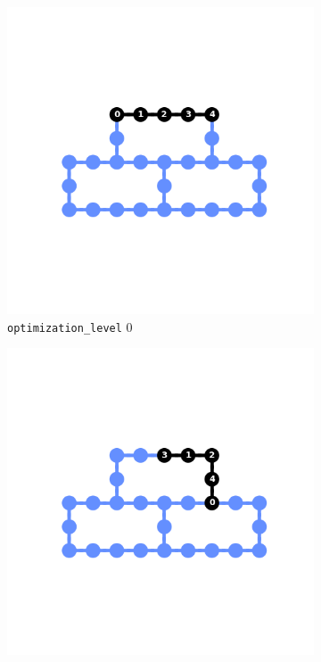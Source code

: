\documentclass[11pt]{article}
\begin{document}
\begin{figure}[hbtp]
    \begin{subfigure}{0.24\linewidth}
        \centering
        \includegraphics[width=\linewidth]{outputs/routing_FakeCambridgeV2_0.png}
        \caption{\texttt{optimization\_level} $0$}
    \end{subfigure}
    \begin{subfigure}{0.24\linewidth}
        \centering
        \includegraphics[width=\linewidth]{outputs/routing_FakeCambridgeV2_1.png}

\end{subfigure}
\end{figure}
\end{document}
